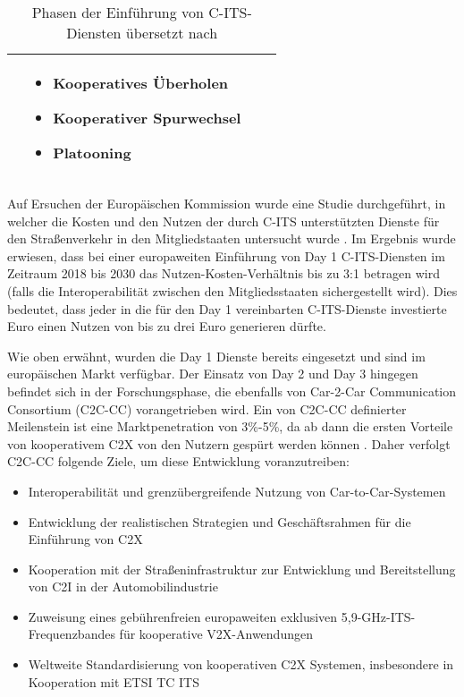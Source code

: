 \begin{table}[h!]
\begin{tabular}{|m{4em}|m{10em}|m{10em}|m{8em}|}
\begin{itemize}[leftmargin=0.3cm]
	\end{itemize} & 
	\begin{itemize}[leftmargin=0.3cm] \item Kooperatives Überholen
	
	\item Kooperativer Spurwechsel
	
	\item Platooning
	
	\end{itemize} \\ 
		\hline
	\end{tabular}
	\caption{Phasen der Einführung von C-ITS-Diensten übersetzt nach \cite{Car2Car}}
	\label{table:1}
\end{table}

Auf Ersuchen der Europäischen Kommission wurde eine Studie durchgeführt, in welcher die Kosten und den Nutzen der durch C-ITS unterstützten Dienste für den Straßenverkehr in den Mitgliedstaaten untersucht wurde \cite{StudyDeployment}. Im Ergebnis wurde erwiesen, dass bei einer europaweiten Einführung von Day 1 C-ITS-Diensten im Zeitraum 2018 bis 2030 das Nutzen-Kosten-Verhältnis bis zu 3:1 betragen wird (falls die Interoperabilität zwischen den Mitgliedsstaaten sichergestellt wird). Dies bedeutet, dass jeder in die für den Day 1 vereinbarten C-ITS-Dienste investierte Euro einen Nutzen von bis zu drei Euro generieren dürfte. 

Wie oben erwähnt, wurden die Day 1 Dienste bereits eingesetzt und sind im europäischen Markt verfügbar. Der Einsatz von Day 2 und Day 3 hingegen befindet sich in der Forschungsphase, die ebenfalls von Car-2-Car Communication Consortium (C2C-CC) vorangetrieben wird. Ein von C2C-CC definierter Meilenstein ist eine Marktpenetration von 3\%-5\%, da ab dann die ersten Vorteile von kooperativem C2X von den Nutzern gespürt werden können \cite{Car2Car}. Daher verfolgt C2C-CC folgende Ziele, um diese Entwicklung voranzutreiben:

\begin{itemize}
	\item Interoperabilität und grenzübergreifende Nutzung von Car-to-Car-Systemen
	\item Entwicklung der realistischen Strategien und Geschäftsrahmen für die Einführung von C2X
	\item Kooperation mit der Straßeninfrastruktur zur Entwicklung und Bereitstellung von C2I in der Automobilindustrie
	\item Zuweisung eines gebührenfreien europaweiten exklusiven 5,9-GHz-ITS-Frequenzbandes für kooperative V2X-Anwendungen
	\item Weltweite Standardisierung von kooperativen C2X Systemen, insbesondere in Kooperation mit ETSI TC ITS
\end{itemize}

